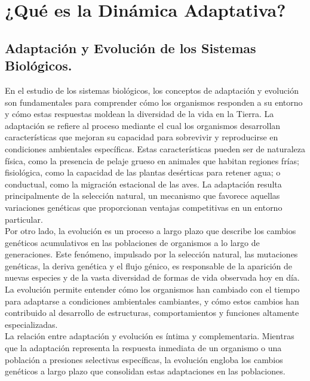 \section{¿Qué es la Dinámica Adaptativa?}{

        \subsection{Adaptación y Evolución de los Sistemas Biológicos.}{



            \normalsize{En el estudio de los sistemas biológicos, los conceptos de adaptación y evolución son fundamentales para comprender cómo los organismos responden a su entorno y cómo estas respuestas moldean la diversidad de la vida en la Tierra. \citep{adaptacion} La adaptación se refiere al proceso mediante el cual los organismos desarrollan características que mejoran su capacidad para sobrevivir y reproducirse en condiciones ambientales específicas. Estas características pueden ser de naturaleza física, como la presencia de pelaje grueso en animales que habitan regiones frías; fisiológica, como la capacidad de las plantas desérticas para retener agua; o conductual, como la migración estacional de las aves. La adaptación resulta principalmente de la selección natural, un mecanismo que favorece aquellas variaciones genéticas que proporcionan ventajas competitivas en un entorno particular.}\\

            \normalsize{\citep {evolucion} Por otro lado, la evolución es un proceso a largo plazo que describe los cambios genéticos acumulativos en las poblaciones de organismos a lo largo de generaciones. Este fenómeno, impulsado por la selección natural, las mutaciones genéticas, la deriva genética y el flujo génico, es responsable de la aparición de nuevas especies y de la vasta diversidad de formas de vida observada hoy en día. La evolución permite entender cómo los organismos han cambiado con el tiempo para adaptarse a condiciones ambientales cambiantes, y cómo estos cambios han contribuido al desarrollo de estructuras, comportamientos y funciones altamente especializadas.}\\

            \normalsize{La relación entre adaptación y evolución es íntima y complementaria. Mientras que la adaptación representa la respuesta inmediata de un organismo o una población a presiones selectivas específicas, la evolución engloba los cambios genéticos a largo plazo que consolidan estas adaptaciones en las poblaciones.}\\

}}
